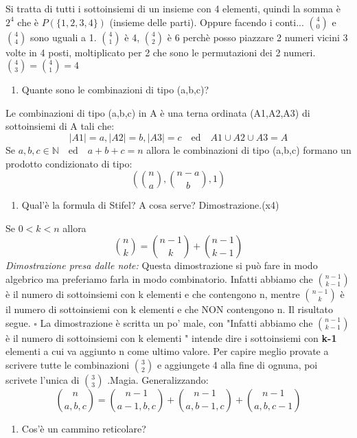 Si tratta di tutti i sottoinsiemi di un insieme con 4 elementi, quindi la somma è $2^4$ che è $P(\{1,2,3,4\})$ (insieme delle parti).\newline
Oppure facendo i conti...\newline
$\binom{4}{0}$ e $\binom{4}{4}$ sono uguali a 1. $\binom{4}{1}$ è 4, $\binom{4}{2} $ è 6 perchè posso piazzare 2 numeri vicini 3 volte in 4 posti, moltiplicato per 2 che sono le permutazioni dei 2 numeri. $\binom{4}{3} = \binom{4}{1} = 4$
 \begin{enumerate}[resume]\bfseries
\item Quante sono le combinazioni di tipo (a,b,c)?
\end{enumerate}
Le combinazioni di tipo  (a,b,c) in A è una terna ordinata (A1,A2,A3) di sottoinsiemi di A tali che: \[\vert A1\vert = a,  \vert A2\vert = b,  \vert A3\vert = c \quad \text{ed} \quad A1\cup A2\cup A3 = A\] Se $a,b,c \in \mathbb{N} \quad \text{ed} \quad a+b+c=n$ allora le combinazioni di tipo (a,b,c) formano un prodotto condizionato di tipo: \[ \left(  \binom{n}{a}, \binom{n-a}{b}, 1\right) \]
 \begin{enumerate}[resume]\bfseries
\item Qual'è la formula di Stifel? A cosa serve? Dimostrazione.(x4)
\end{enumerate}
Se $0 < k < n$ allora
\[\binom{n}{k} = \binom{n-1}{k} + \binom{n-1}{k-1}\]
\textit{Dimostrazione presa dalle note:}\newline
Questa dimostrazione si può fare in modo algebrico ma preferiamo farla in modo combinatorio. Infatti abbiamo che
$\binom{n-1}{k-1} $ è il numero di sottoinsiemi con k elementi e che contengono n, mentre $\binom{n-1}{k}$ è il numero di sottoinsiemi con k elementi e che NON contengono n. Il risultato segue. $\square$\newline
La dimostrazione è scritta un po' male, con  "Infatti abbiamo che $\binom{n-1}{k-1} $ è il numero di sottoinsiemi con k elementi " intende dire i sottoinsiemi con \textbf{k-1} elementi a cui va aggiunto n come ultimo valore. Per capire meglio provate a scrivere tutte le combinazioni  $\binom{3}{2}$ e aggiungete 4 alla fine di ognuna, poi scrivete l'unica di $\binom{3}{3}$ .\newline Magia.\newline
Generalizzando:
\[\binom{n}{a,b,c} = \binom{n-1}{a-1,b,c} + \binom{n-1}{a,b-1,c} + \binom{n-1}{a,b,c-1}\]
 \begin{enumerate}[resume]\bfseries
\item Cos'è un cammino reticolare?
\end{enumerate}
